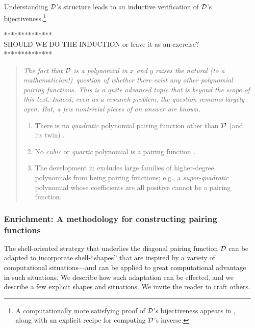 Understanding $\mbox{$\cal D$}$'s structure leads to an inductive verification of
$\mbox{$\cal D$}$'s bijectiveness.\footnote{A computationally more satisfying proof
  of $\mbox{$\cal D$}$'s bijectiveness appears in \cite{Davis58}, along with an
  explicit recipe for computing $\mbox{$\cal D$}$'s inverse.}

\noindent
************** \\
{\Arny SHOULD WE DO THE INDUCTION or leave it as an exercise?} \\
**************

\begin{quote}
{\em The fact that $\mbox{$\cal D$}$ is a {\em polynomial} in $x$ and $y$ raises
  the natural (to a mathematician!)~question of whether there exist
  any other polynomial pairing functions.  This is a quite advanced
  topic that is beyond the scope of this text.  Indeed, even as a
  research problem, the question remains largely open.  But, a few
  nontrivial pieces of an answer are known.}
\begin{enumerate}
\item
There is no {\em quadratic} polynomial pairing function other than
$\mbox{$\cal D$}$ (and its twin) \cite{FueterP23,LewR78a}.
\item
No {\em cubic} or {\em quartic} polynomial is a pairing function
\cite{LewR78b}.
\item
The development in \cite{LewR78b} excludes large families of
higher-degree polynomials from being pairing functions; e.g., a {\em
  super-quadratic} polynomial whose coefficients are all positive
cannot be a pairing function.
\end{enumerate}
\end{quote}

\subsubsection{Enrichment: A methodology for constructing pairing functions}

The shell-oriented strategy that underlies the diagonal pairing
function $\mbox{$\cal D$}$ can be adapted to incorporate shell-``shapes'' that are
inspired by a variety of computational situations---and can be applied
to great computational advantage in such situations.  We describe how
such adaptation can be effected, and we describe a few explicit shapes
and situations.  We invite the reader to craft others.

\medskip

